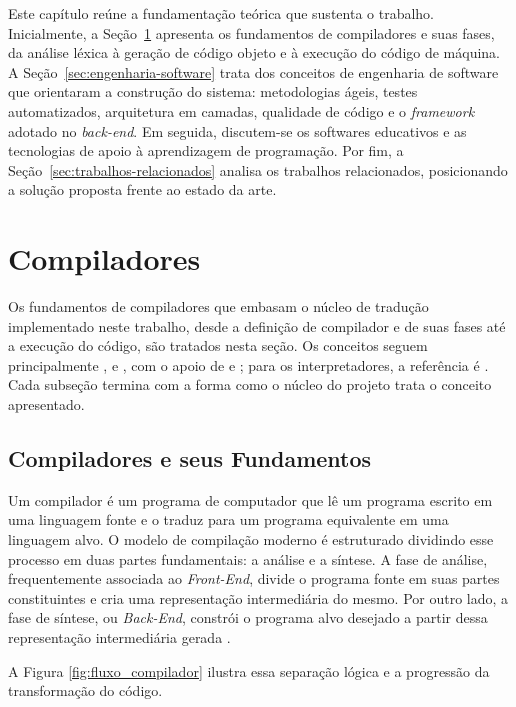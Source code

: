 
Este capítulo reúne a fundamentação teórica que sustenta o trabalho. Inicialmente, a Seção~\ref{sec:compiladores} apresenta os fundamentos de compiladores e suas fases, da análise léxica à geração de código objeto e à execução do código de máquina. A Seção~\ref{sec:engenharia-software} trata dos conceitos de engenharia de software que orientaram a construção do sistema: metodologias ágeis, testes automatizados, arquitetura em camadas, qualidade de código e o \textit{framework} adotado no \textit{back-end}. Em seguida, discutem-se os softwares educativos e as tecnologias de apoio à aprendizagem de programação. Por fim, a Seção~\ref{sec:trabalhos-relacionados} analisa os trabalhos relacionados, posicionando a solução proposta frente ao estado da arte.

\section{Compiladores}
\label{sec:compiladores}

Os fundamentos de compiladores que embasam o núcleo de tradução implementado neste trabalho, desde a definição de compilador e de suas fases até a execução do código, são tratados nesta seção. Os conceitos seguem principalmente ,  e , com o apoio de  e ; para os interpretadores, a referência é . Cada subseção termina com a forma como o núcleo do projeto trata o conceito apresentado.

\subsection{Compiladores e seus Fundamentos}

Um compilador é um programa de computador que lê um programa escrito em uma linguagem fonte e o traduz para um programa equivalente em uma linguagem alvo. O modelo de compilação moderno é estruturado dividindo esse processo em duas partes fundamentais: a análise e a síntese. A fase de análise, frequentemente associada ao \textit{Front-End}, divide o programa fonte em suas partes constituintes e cria uma representação intermediária do mesmo. Por outro lado, a fase de síntese, ou \textit{Back-End}, constrói o programa alvo desejado a partir dessa representação intermediária gerada \cite{aho1995}.

A Figura \ref{fig:fluxo_compilador} ilustra essa separação lógica e a progressão da transformação do código.

